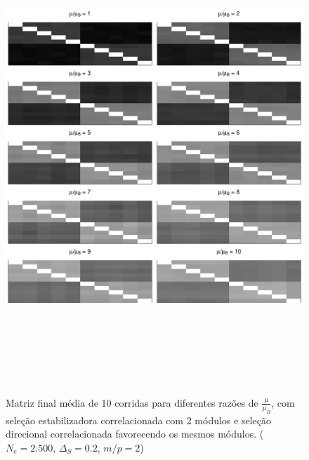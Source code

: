 \begin{figure}[htbp]
    \centering
    \includegraphics[width=150mm, height=180mm]{figuras/MatBDirecRMu}
    \caption{Matriz final média de 10 corridas para diferentes razões de
        $\frac{\mu}{\mu_B}$, com seleção estabilizadora correlacionada com 2
        módulos e seleção direcional correlacionada favorecendo os mesmos
    módulos. ($N_e=2.500$, $\Delta_S=0.2$, $m/p=2$)}
    \label{MatBDirecional-RMu}
\end{figure}

